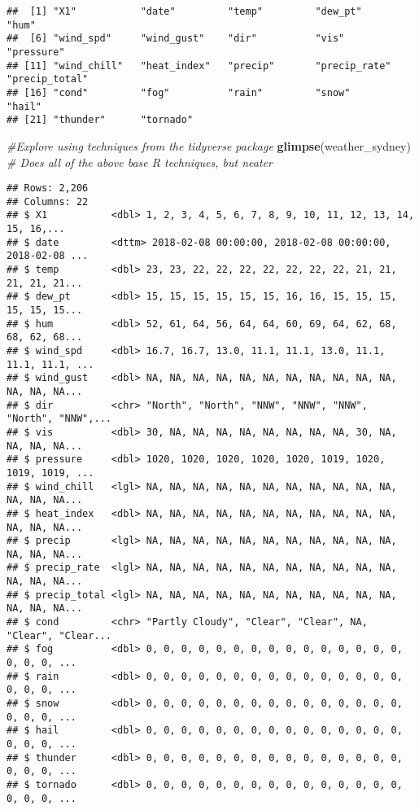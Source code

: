 \documentclass[
]{article}
\newenvironment{Shaded}{\begin{snugshade}}{\end{snugshade}}
\newcommand{\CommentTok}[1]{\textcolor[rgb]{0.56,0.35,0.01}{\textit{#1}}}
\newcommand{\KeywordTok}[1]{\textcolor[rgb]{0.13,0.29,0.53}{\textbf{#1}}}
\newcommand{\NormalTok}[1]{#1}
\begin{document}
\begin{verbatim}
##  [1] "X1"           "date"         "temp"         "dew_pt"       "hum"         
##  [6] "wind_spd"     "wind_gust"    "dir"          "vis"          "pressure"    
## [11] "wind_chill"   "heat_index"   "precip"       "precip_rate"  "precip_total"
## [16] "cond"         "fog"          "rain"         "snow"         "hail"        
## [21] "thunder"      "tornado"
\end{verbatim}

\begin{Shaded}
\begin{Highlighting}[]
\CommentTok{#Explore using techniques from the tidyverse package}
\KeywordTok{glimpse}\NormalTok{(weather_sydney) }\CommentTok{# Does all of the above base R techniques, but neater}
\end{Highlighting}
\end{Shaded}

\begin{verbatim}
## Rows: 2,206
## Columns: 22
## $ X1           <dbl> 1, 2, 3, 4, 5, 6, 7, 8, 9, 10, 11, 12, 13, 14, 15, 16,...
## $ date         <dttm> 2018-02-08 00:00:00, 2018-02-08 00:00:00, 2018-02-08 ...
## $ temp         <dbl> 23, 23, 22, 22, 22, 22, 22, 22, 22, 21, 21, 21, 21, 21...
## $ dew_pt       <dbl> 15, 15, 15, 15, 15, 15, 16, 16, 15, 15, 15, 15, 15, 15...
## $ hum          <dbl> 52, 61, 64, 56, 64, 64, 60, 69, 64, 62, 68, 68, 62, 68...
## $ wind_spd     <dbl> 16.7, 16.7, 13.0, 11.1, 11.1, 13.0, 11.1, 11.1, 11.1, ...
## $ wind_gust    <dbl> NA, NA, NA, NA, NA, NA, NA, NA, NA, NA, NA, NA, NA, NA...
## $ dir          <chr> "North", "North", "NNW", "NNW", "NNW", "North", "NNW",...
## $ vis          <dbl> 30, NA, NA, NA, NA, NA, NA, NA, NA, 30, NA, NA, NA, NA...
## $ pressure     <dbl> 1020, 1020, 1020, 1020, 1020, 1019, 1020, 1019, 1019, ...
## $ wind_chill   <lgl> NA, NA, NA, NA, NA, NA, NA, NA, NA, NA, NA, NA, NA, NA...
## $ heat_index   <dbl> NA, NA, NA, NA, NA, NA, NA, NA, NA, NA, NA, NA, NA, NA...
## $ precip       <lgl> NA, NA, NA, NA, NA, NA, NA, NA, NA, NA, NA, NA, NA, NA...
## $ precip_rate  <lgl> NA, NA, NA, NA, NA, NA, NA, NA, NA, NA, NA, NA, NA, NA...
## $ precip_total <lgl> NA, NA, NA, NA, NA, NA, NA, NA, NA, NA, NA, NA, NA, NA...
## $ cond         <chr> "Partly Cloudy", "Clear", "Clear", NA, "Clear", "Clear...
## $ fog          <dbl> 0, 0, 0, 0, 0, 0, 0, 0, 0, 0, 0, 0, 0, 0, 0, 0, 0, 0, ...
## $ rain         <dbl> 0, 0, 0, 0, 0, 0, 0, 0, 0, 0, 0, 0, 0, 0, 0, 0, 0, 0, ...
## $ snow         <dbl> 0, 0, 0, 0, 0, 0, 0, 0, 0, 0, 0, 0, 0, 0, 0, 0, 0, 0, ...
## $ hail         <dbl> 0, 0, 0, 0, 0, 0, 0, 0, 0, 0, 0, 0, 0, 0, 0, 0, 0, 0, ...
## $ thunder      <dbl> 0, 0, 0, 0, 0, 0, 0, 0, 0, 0, 0, 0, 0, 0, 0, 0, 0, 0, ...
## $ tornado      <dbl> 0, 0, 0, 0, 0, 0, 0, 0, 0, 0, 0, 0, 0, 0, 0, 0, 0, 0, ...
\end{verbatim}
\end{document}

